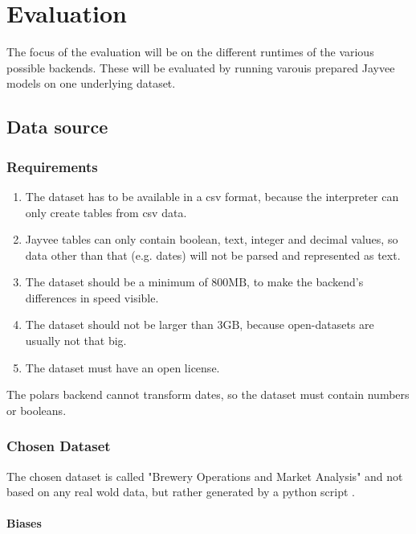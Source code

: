\chapter{Evaluation}
\label{chapter:Evaluation}

The focus of the evaluation will be on the different runtimes of the various possible backends. These will be evaluated by running varouis prepared Jayvee models on one underlying dataset.

\section{Data source}
\label{section:data_source}

\subsection{Requirements}
\label{subsection:data_source_requirements}
\begin{enumerate}
	\item The dataset has to be available in a csv format, because the interpreter can only create tables from csv data.
	\item Jayvee tables can only contain boolean, text, integer and decimal values, so data other than that (e.g. dates) will not be parsed and represented as text.
	\item The dataset should be a minimum of $800\text{MB}$, to make the backend's differences in speed visible.
	\item The dataset should not be larger than $3\text{GB}$, because open-datasets are usually not that big. %
	\item The dataset must have an open license.%
\end{enumerate}

The polars backend cannot transform dates, so the dataset must contain numbers or booleans.

\subsection{Chosen Dataset}
The chosen dataset is called "Brewery Operations and Market Analysis" and not based on any real wold data, but rather generated by a python script \autocite{dataset}.

\subsubsection{Biases}

